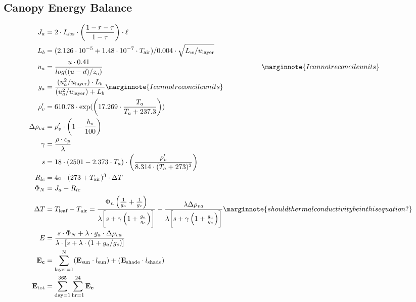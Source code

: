 \documentclass[10pt]{article}
\begin{document}
\subsection*{Canopy Energy Balance}

\begin{align}
 J_a &= 2 \cdot I_{\text{abs}} \cdot \left(\frac{1-r-\tau}{1-\tau}\right) \cdot \ell \label{eqn:Ja} \\
 L_b &= (2.126 \cdot 10^{-5} + 1.48 \cdot 10^{-7} \cdot T_\text{air}) / 0.004 \cdot \sqrt{L_w / u_{\text{layer}}} \label{eqn:Lb}\\
 u_a &= \frac{u \cdot 0.41}{log((u-d)/z_o)} \hspace{3.1in} \label{eqn:ua} \marginnote{I can not reconcile units}\\
 g_a &= \frac{(u_{a}^{2}/u_{\text{layer}}) \cdot L_b}{(u_{a}^{2}/u_{\text{layer}}) + L_b} \label{eqn:ga} \marginnote{I can not reconcile units}\\
 \rho_{v}^{\prime} &= 610.78 \cdot \exp(\left( 17.269 \cdot \frac{T_a}{T_a + 237.3} \right)) \label{eqn:rhop} \\
 \Delta \rho_{va} &= \rho_{v}^{\prime} \cdot \left( 1-\frac{h_s}{100} \right) \label{eqn:Deltarho} \\
 \gamma &= \frac{\rho \cdot c_p}{\lambda} \label{eqn:gamma} \\
 s &= 18 \cdot (2501 - 2.373 \cdot T_a) \cdot \left(\frac{\rho_{v}^{\prime}}{8.314 \cdot (T_a + 273)^2} \right) \label{eqn:s} \\
 R_{lc} &= 4 \sigma \cdot (273+T_{\text{air}})^3 \cdot \Delta T \label{eqn:Rlc} \\
 \Phi_N &= J_a - R_{lc} \label{eqn:PhiN} \\
 \Delta T &= T_{\text{leaf}} - T_{\text{air}} = \frac{\Phi_n \left(\frac{1}{g_a}+\frac{1}{g_c} \right)}{\lambda \biggl[ s+ \gamma \left( 1 + \frac{g_a}{g_c} \right) \biggr]} - \frac{\lambda \Delta \rho_{va}}{\lambda \biggl[ s+\gamma\left(1+\frac{g_a}{g_c}\right) \biggr] } \label{eqn:DeltaT} \marginnote{should thermal conductivity be in this equation?} \\
 E &= \frac{ s \cdot \Phi_N + \lambda \cdot g_a \cdot \Delta \rho_{va}}{\lambda \cdot [ s + \lambda \cdot (1+g_a / g_c)]} \label{eqn:E} \\
 \mathbf{E_c} &= \sum_{\text{layer}=1}^\text{N} (\mathbf{E_{\text{sun}}} \cdot l_{\text{sun}}) + (\mathbf{E_{\text{shade}}} \cdot l_{\text{shade}}) \label{eqn:Ec}\\ 
 \mathbf{E_{\text{tot}}} &= \sum_{\text{day}=1}^{365}\sum_{\text{hr}=1}^{24}  \mathbf{E_c} \label{eqn:Etot}
\end{align}
\end{document}
